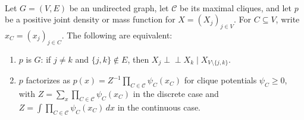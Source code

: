 \begin{definition} \label{def:sl-markov-random-field} \\
Let $G=(V,E)$ be an undirected graph, let $\mathcal{C}$ be its maximal cliques, and let $p$ be a positive joint density or mass function for $X=(X_j)_{j\in V}$. For $C\subseteq V$, write $x_C=(x_j)_{j\in C}$. The following are equivalent:
\begin{enumerate}[label=(\roman*)]
\setlength{\itemsep}{0pt}
\item $p$ is  $G$: if $j\neq k$ and $\{j,k\}\notin E$, then $X_j\perp\!\!\!\perp X_k\mid X_{V\setminus\{j,k\}}$.
\item $p$ factorizes as $p(x)=Z^{-1}\prod\limits_{C\in\mathcal{C}}\psi_C(x_C)$ for clique potentials $\psi_C\geq0$, with $Z=\sum_x\prod\limits_{C\in\mathcal{C}}\psi_C(x_C)$ in the discrete case and $Z=\int\prod\limits_{C\in\mathcal{C}}\psi_C(x_C)\,dx$ in the continuous case.
\end{enumerate}
\end{definition}

